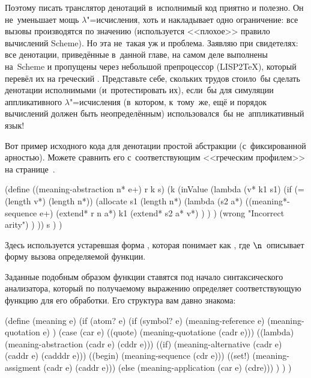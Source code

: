 Поэтому писать транслятор денотаций в~исполнимый код приятно и полезно. Он
не~уменьшает мощь $\lambda$"=исчисления, хоть и накладывает одно ограничение:
все вызовы производятся по значению (используется <<плохое>> правило вычислений
Scheme). Но эта не~такая уж и проблема. Заявляю при свидетелях: все денотации,
приведённые в~данной главе, на самом деле выполнены на~Scheme и пропущены через
небольшой препроцессор (LISP2\TeX), который перевёл их на греческий
\cite{que93d}. %
Представьте себе, скольких трудов стоило~бы сделать денотации
исполнимыми (и~протестировать их), если~бы для симуляции аппликативного
$\lambda$"=исчисления (в~котором, к~тому~же, ещё и порядок вычислений должен
быть неопределённым) использовался~бы не~аппликативный язык!

Вот пример исходного кода для денотации простой абстракции (с~фиксированной
арностью). Можете сравнить его с~соответствующим <<греческим профилем>>
на странице~\pageref{denotational/sematics/fig:naked-scheme}.

\begin{code:lisp}
(define ((meaning-abstraction n* e+) r k s)
  (k (inValue (lambda (v* k1 s1)
                (if (= (length v*) (length n*))
                    (allocate s1 (length n*)
                              (lambda (s2 a*)
                                ((meaning*-sequence e+)
                                 (extend* r n a*)
                                 k1
                                 (extend* s2 a* v*) ) ) )
                    (wrong "Incorrect arity") ) ))
     s ) )
\end{code:lisp}

Здесь используется устаревшая форма , которая понимает  как , где $\n$~описывает форму вызова определяемой функции.

Заданные подобным образом функции ставятся под начало синтаксического
анализатора, который по получаемому выражению определяет соответствующую
функцию для его обработки. Его структура вам давно знакома:

\begin{code:lisp}
(define (meaning e)
  (if (atom? e)
      (if (symbol? e) (meaning-reference e)
                      (meaning-quotation e) )
      (case (car e)
        ((quote)  (meaning-quotatione (cadr e)))
        ((lambda) (meaning-abstraction (cadr e) (cddr e)))
        ((if)     (meaning-alternative (cadr e) (caddr e) (cadddr e)))
        ((begin)  (meaning-sequence (cdr e)))
        ((set!)   (meaning-assigment (cadr e) (caddr e)))
        (else     (meaning-application (car e) (cdre))) ) ) )
\end{code:lisp}


